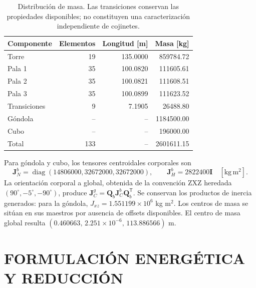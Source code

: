 \documentclass[oneside,a4paper,spanish,links,pagenumbers]{amca}
\newcommand{\I}{\bm I}
\newcommand{\tr}{\mathsf T}
\newcommand{\diag}{\operatorname{diag}}
\begin{document}
\begin{table}[htbp]\centering\small
\begin{tabular}{lrrr}\toprule
Componente & Elementos & Longitud [m] & Masa [kg]\\\midrule
Torre &19&135.0000&859784.72\\
Pala 1 &35&100.0820&111605.61\\
Pala 2 &35&100.0821&111608.51\\
Pala 3 &35&100.0899&111623.52\\
Transiciones &9&7.1905&26488.80\\
Góndola &--&--&1184500.00\\
Cubo &--&--&196000.00\\\midrule
Total &133&--&2601611.15\\\bottomrule
\end{tabular}
\caption{Distribución de masa. Las transiciones conservan las propiedades disponibles; no constituyen una caracterización independiente de cojinetes.}\label{tab:masas}
\end{table}

Para góndola y cubo, los tensores centroidales corporales son
\begin{equation}
 \bm J_N^b=\diag(14806000,32672000,32672000),\qquad
 \bm J_H^b=2822400\I\quad[\mathrm{kg\,m^2}].
\end{equation}
La orientación corporal a global, obtenida de la convención ZXZ heredada $(90^\circ,-5^\circ,-90^\circ)$, produce $\bm J_C^g=\bm Q_b\bm J_C^b\bm Q_b^\tr$. Se conservan los productos de inercia generados: para la góndola, $J_{xz}=1.551199\times10^6$ kg m$^2$. Los centros de masa se sitúan en sus maestros por ausencia de offsets disponibles. El centro de masa global resulta $(0.460663,\,2.251\times10^{-6},\,113.886566)$ m.

\section{FORMULACIÓN ENERGÉTICA Y REDUCCIÓN}
\label{sec:formulacion}
\end{document}
